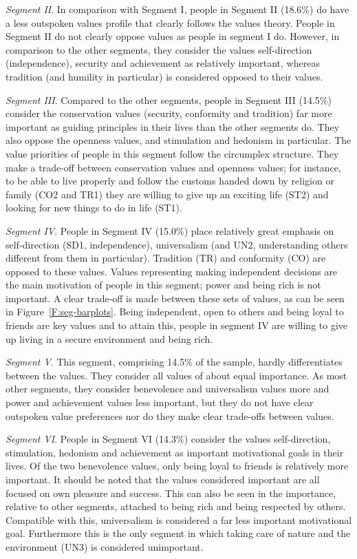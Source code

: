 \documentclass[12pt,letter]{article}\usepackage[]{graphicx}\usepackage[]{xcolor}
\begin{document}
\emph{Segment II}. In comparison with Segment I, people in Segment II  (18.6\%) do have a less outspoken values profile that clearly follows the values theory. People in Segment II do not clearly oppose values as people in segment I do. However, in comparison to the other segments, they consider the values self-direction (independence), security and achievement as relatively important, whereas tradition (and humility in particular) is considered opposed to their values.


\emph{Segment III}. Compared to the other segments, people in Segment III (14.5\%) consider the conservation values (security, conformity and tradition) far more important as guiding principles in their lives than the other segments do. They also oppose the openness values, and stimulation and hedonism in particular. The value priorities of people in this segment follow the circumplex structure. They make a trade-off between conservation values and openness values; for instance, to be able to live properly and follow the customs handed down by religion or family (CO2 and TR1) they are willing to give up an exciting life (ST2) and looking for new things to do in life (ST1).


\emph{Segment IV}. People in Segment IV (15.0\%) place relatively great emphasis on self-direction (SD1, independence), universalism (and UN2, understanding others different from them in particular). Tradition (TR) and conformity (CO) are opposed to these values. Values representing making independent decisions are the main motivation of people in this segment; power and being rich is not important. A clear trade-off is made between these sets of values, as can be seen in Figure~\ref{F:seg-barplots}. Being independent, open to others and being loyal to friends are key values and to attain this, people in segment IV are willing to give up living in a secure environment and being rich.

\emph{Segment V}. This segment, comprising 14.5\% of the sample, hardly differentiates between the values. They consider all values of about equal importance. As most other segments, they consider benevolence and universalism values more and power and achievement values less important, but they do not have clear outspoken value preferences nor do they make clear trade-offs between values. 

\emph{Segment VI}. People in Segment VI (14.3\%) consider the values self-direction, stimulation, hedonism and achievement as important motivational goals in their lives. Of the two benevolence values, only being loyal to friends is relatively more important. It should be noted that the values considered important are all focused on own pleasure and success. This can also be seen in the importance, relative to other segments, attached to being rich and being respected by others. Compatible with this, universalism is considered a far less important motivational goal. Furthermore this is the only segment in which taking care of nature and the environment (UN3) is considered unimportant.
\end{document}
